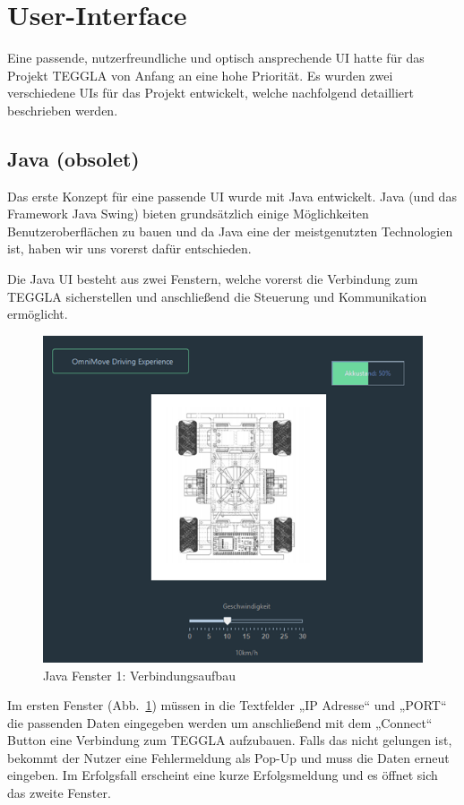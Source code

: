 \section{User-Interface}
Eine passende, nutzerfreundliche und optisch ansprechende UI hatte für das Projekt TEGGLA von Anfang an eine hohe Priorität. Es wurden zwei verschiedene UIs für das Projekt entwickelt, welche nachfolgend detailliert beschrieben werden. 

\subsection{Java (obsolet)}
Das erste Konzept für eine passende UI wurde mit Java entwickelt. 
Java (und das Framework Java Swing) bieten grundsätzlich einige Möglichkeiten Benutzeroberflächen zu bauen und da Java eine der meistgenutzten Technologien ist, haben wir uns vorerst dafür entschieden.

Die Java UI besteht aus zwei Fenstern, welche vorerst die Verbindung zum TEGGLA sicherstellen und anschließend die Steuerung und Kommunikation ermöglicht. 

\begin{figure}[!ht]
	\centering
	\includegraphics[width=\textwidth]{bilder/java1.png}
	\caption{Java Fenster 1: Verbindungsaufbau}
	\label{bild:java1}
\end{figure}


Im ersten Fenster (Abb.~\ref{bild:java1}) müssen in die Textfelder „IP Adresse“ und „PORT“ die passenden Daten eingegeben werden um anschließend mit dem „Connect“ Button eine Verbindung zum TEGGLA aufzubauen. 
Falls das nicht gelungen ist, bekommt der Nutzer eine Fehlermeldung als Pop-Up und muss die Daten erneut eingeben. 
Im Erfolgsfall erscheint eine kurze Erfolgsmeldung und es öffnet sich das zweite Fenster.

